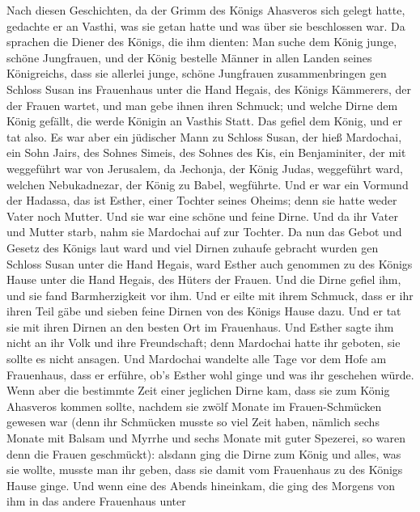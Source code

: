  Nach diesen Geschichten, da der Grimm des Königs
Ahasveros sich gelegt hatte, gedachte er an Vasthi, was sie getan hatte
und was über sie beschlossen war.  Da sprachen die Diener
des Königs, die ihm dienten: Man suche dem König junge, schöne
Jungfrauen,  und der König bestelle Männer in allen Landen
seines Königreichs, dass sie allerlei junge, schöne Jungfrauen
zusammenbringen gen Schloss Susan ins Frauenhaus unter die Hand Hegais,
des Königs Kämmerers, der der Frauen wartet, und man gebe ihnen ihren
Schmuck;  und welche Dirne dem König gefällt, die werde
Königin an Vasthis Statt. Das gefiel dem König, und er tat also.
 Es war aber ein jüdischer Mann zu Schloss Susan, der hieß
Mardochai, ein Sohn Jairs, des Sohnes Simeis, des Sohnes des Kis, ein
Benjaminiter,  der mit weggeführt war von Jerusalem, da
Jechonja, der König Judas, weggeführt ward, welchen Nebukadnezar, der
König zu Babel, wegführte.  Und er war ein Vormund der
Hadassa, das ist Esther, einer Tochter seines Oheims; denn sie hatte
weder Vater noch Mutter. Und sie war eine schöne und feine Dirne. Und da
ihr Vater und Mutter starb, nahm sie Mardochai auf zur Tochter.
 Da nun das Gebot und Gesetz des Königs laut ward und viel
Dirnen zuhaufe gebracht wurden gen Schloss Susan unter die Hand Hegais,
ward Esther auch genommen zu des Königs Hause unter die Hand Hegais, des
Hüters der Frauen.  Und die Dirne gefiel ihm, und sie fand
Barmherzigkeit vor ihm. Und er eilte mit ihrem Schmuck, dass er ihr
ihren Teil gäbe und sieben feine Dirnen von des Königs Hause dazu. Und
er tat sie mit ihren Dirnen an den besten Ort im Frauenhaus.
 Und Esther sagte ihm nicht an ihr Volk und ihre
Freundschaft; denn Mardochai hatte ihr geboten, sie sollte es nicht
ansagen.  Und Mardochai wandelte alle Tage vor dem Hofe
am Frauenhaus, dass er erführe, ob's Esther wohl ginge und was ihr
geschehen würde.  Wenn aber die bestimmte Zeit einer
jeglichen Dirne kam, dass sie zum König Ahasveros kommen sollte, nachdem
sie zwölf Monate im Frauen-Schmücken gewesen war (denn ihr Schmücken
musste so viel Zeit haben, nämlich sechs Monate mit Balsam und Myrrhe
und sechs Monate mit guter Spezerei, so waren denn die Frauen
geschmückt):  alsdann ging die Dirne zum König und alles,
was sie wollte, musste man ihr geben, dass sie damit vom Frauenhaus zu
des Königs Hause ginge.  Und wenn eine des Abends
hineinkam, die ging des Morgens von ihm in das andere Frauenhaus unter
